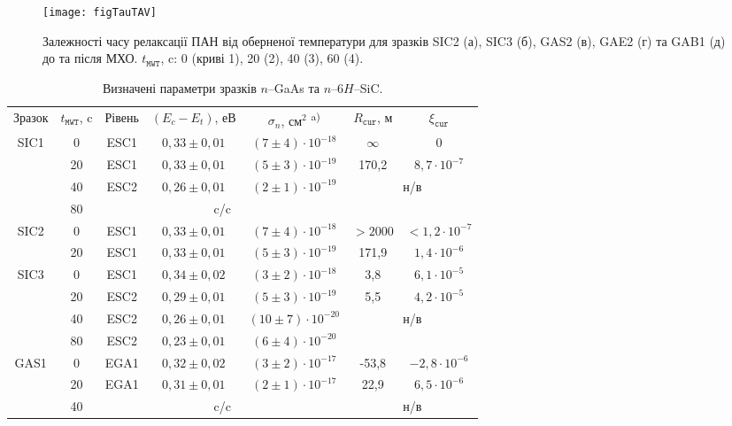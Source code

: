 \documentclass[a4paper,14pt,oneside,openany]{memoir}
\begin{document}
\begin{figure}
\center
\texttt{[image: figTauTAV]}
\caption{\label{figTauTAV}
Залежності часу релаксації ПАН від оберненої температури для
зразків SIC2 (а), SIC3 (б), GAS2 (в), GAE2 (г) та GAB1 (д) до та після МХО.
$t_\mathtt{MWT}$, c: 0 (криві 1), 20 (2), 40 (3), 60 (4).
}%
\end{figure}

\begin{table}
\caption{\label{tabMW}Визначені параметри зразків $n$--GaAs та $n$--6$H$--SiC.
}
\center
\begin{tabular}{|c|c|c|c|c|c|c|}
\hline
Зразок& $t_\mathtt{MWT}$, c &Рівень &$(E_c-E_t)$, еВ &$\sigma_n$, см$^2$\textsuperscript{ a)}&$R_\mathtt{cur}$, м&$\xi_\mathtt{cur}$\\
\hhline{|=======|}
SIC1& 0 &ESC1& $0,33\pm0,01$ &$(7\pm4)\cdot10^{-18}$&$\infty$&0\\ \cline{2-7}
& 20 &ESC1& $0,33\pm0,01$ &$(5\pm3)\cdot10^{-19}$&170,2&$8,7\cdot10^{-7}$\\ \cline{2-7}
& 40 &ESC2& $0,26\pm0,01$ &$(2\pm1)\cdot10^{-19}$&\multicolumn{2}{c|}{\multirow{2}{*}{н/в}}\\ \cline{2-5}
& 80 & \multicolumn{3}{c|}{c/c}&\multicolumn{2}{c|}{}\\ \hline
SIC2& 0 &ESC1& $0,33\pm0,01$ &$(7\pm4)\cdot10^{-18}$&$>2000$&$<1,2\cdot10^{-7}$\\ \cline{2-7}
& 20 &ESC1& $0,33\pm0,01$ &$(5\pm3)\cdot10^{-19}$&171,9&$1,4\cdot10^{-6}$\\ \hline
SIC3& 0 &ESC1& $0,34\pm0,02$ &$(3\pm2)\cdot10^{-18}$&3,8&$6,1\cdot10^{-5}$\\ \cline{2-7}
& 20 &ESC2&$0,29\pm0,01$ &$(5\pm3)\cdot10^{-19}$&5,5&$4,2\cdot10^{-5}$\\ \cline{2-7}
& 40 &ESC2& $0,26\pm0,01$ &$(10\pm7)\cdot10^{-20}$&\multicolumn{2}{c|}{\multirow{2}{*}{н/в}}\\ \cline{2-5}
& 80 &ESC2& $0,23\pm0,01$ &$(6\pm4)\cdot10^{-20}$&\multicolumn{2}{c|}{}\\ \hline
GAS1& 0 &EGA1& $0,32\pm0,02$ &$(3\pm2)\cdot10^{-17}$&-53,8&$-2,8\cdot10^{-6}$\\ \cline{2-7}
& 20 &EGA1& $0,31\pm0,01$ &$(2\pm1)\cdot10^{-17}$&22,9&$6,5\cdot10^{-6}$\\ \cline{2-7}
& 40 & \multicolumn{3}{c|}{c/c}&\multicolumn{2}{c|}{н/в}\\ \hline

\end{tabular}
\end{table}
\end{document}
